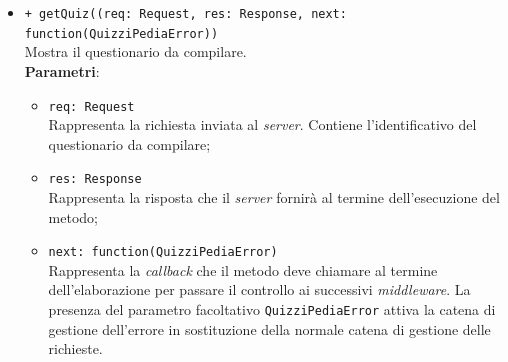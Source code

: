 \begin{itemize}
\begin{itemize}
			\item \texttt{+ getQuiz((req: Request, res: Response, next: function(QuizziPediaError))}\\
			Mostra il questionario da compilare.\\
			\textbf{Parametri}:
			\begin{itemize}
				\item \texttt{req: Request}\\
			Rappresenta la richiesta inviata al \textit{server}. Contiene l'identificativo del questionario da compilare;
				\item \texttt{res: Response}\\
			Rappresenta la risposta che il \textit{server} fornirà al termine dell'esecuzione del metodo;
				\item \texttt{next: function(QuizziPediaError)}\\
			Rappresenta la \textit{callback} che il metodo deve chiamare al termine dell'elaborazione per passare il controllo ai successivi \textit{middleware}. La presenza del parametro facoltativo \texttt{QuizziPediaError} attiva la catena di gestione dell'errore in sostituzione della normale catena di gestione delle richieste.
			\end{itemize}
	\end{itemize}		
\end{itemize}